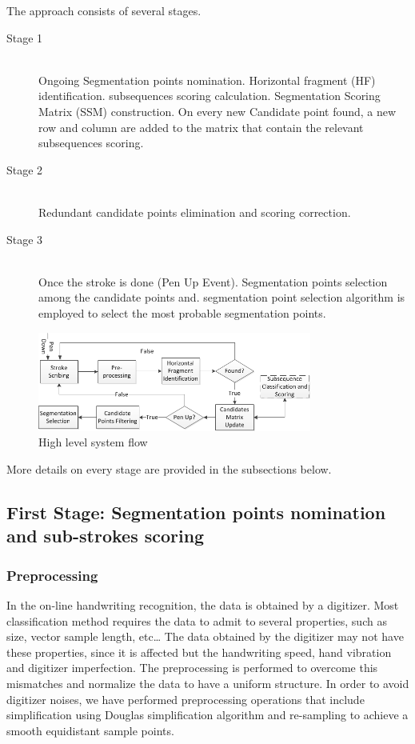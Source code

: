 \documentclass[12pt,journal,compsoc]{IEEEtran}
\begin{document}
The approach consists of several stages. 
\begin{description}
  \item[Stage 1] \hfill \\
  Ongoing Segmentation points nomination. Horizontal fragment (HF) identification. subsequences scoring calculation. Segmentation Scoring Matrix (SSM) construction. On every new Candidate point found, a new row and column are added to the matrix that contain the relevant subsequences scoring.
  \item[Stage 2] \hfill \\
  Redundant candidate points elimination and scoring correction.
  \item[Stage 3] \hfill \\
  Once the stroke is done (Pen Up Event). Segmentation points selection among the candidate points and. segmentation point selection algorithm is employed to select the most probable segmentation points.
\end{description}

\begin{figure}[h]
\centering
\includegraphics[width=9cm]{./figures/system_flow}
\caption{High level system flow}
\label{fig:system_flow}
\end{figure}

More details on every stage are provided in the subsections below.

\subsection{First Stage: Segmentation points nomination and sub-strokes scoring}

\subsubsection{Preprocessing}
In the on-line handwriting recognition, the data is obtained by a digitizer. Most classification method requires the data to admit to several properties, such as size, vector sample length, etc… The data obtained by the digitizer may not have these properties, since it is affected but the handwriting speed, hand vibration and digitizer imperfection. The preprocessing is performed to overcome this mismatches and normalize the data to have a uniform structure. In order to avoid digitizer noises, we have performed preprocessing operations that include simplification using Douglas simplification algorithm and re-sampling to achieve a smooth equidistant sample points. 
 
\end{document}
